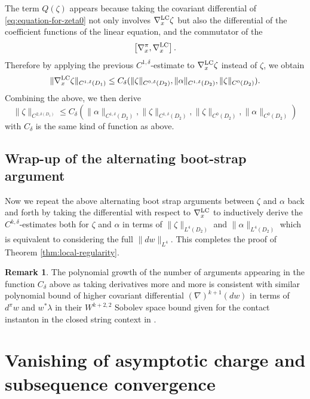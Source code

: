\documentclass[reqno]{amsart}
\theoremstyle{theorem}
\theoremstyle{definition}
\newtheorem{rem}[thm]{Remark}
\numberwithin{equation}{section}
\begin{document}
The term $Q(\zeta)$ appears because taking the covariant
differential of \eqref{eq:equation-for-zeta0} not only involves $\nabla^{\text{\rm LC}}_x \zeta$
but also the differential of the coefficient functions of the linear equation, and
the commutator of the
$$
\left [\nabla^\pi_x,\nabla_x^{\text{\rm LC}} \right].
$$
Therefore by applying the previous $C^{1,\delta}$-estimate to $\nabla_x^{\text{\rm LC}}\zeta$
instead of $\zeta$, we obtain
$$
\|\nabla^{\text{\rm LC}}_x \zeta\|_{C^{1,\delta}(D_1)} \leq
C_\delta(\|\zeta\|_{C^{0,\delta}(D_2)}, \|\alpha \|_{C^{1,\delta}(D_2)},
\|\zeta\|_{C^0(D_2)}).
$$
Combining the above, we  then derive
$$
\|\zeta\|_{C^{2,\delta(D_1)}} \leq C_\delta(\|\alpha\|_{C^{1,\delta}(D_2)},
\|\zeta\|_{C^{1,\delta}(D_2)},
\|\zeta\|_{C^0(D_2)}, \|\alpha\|_{C^0(D_2)})
$$
with $C_\delta$ is the same kind of function as above.

\subsection{Wrap-up of the alternating boot-strap argument}

Now we repeat the above alternating boot strap arguments between $\zeta$ and $\alpha$
back and forth by taking the differential with respect to $\nabla_x^{\text{\rm LC}}$
to inductively derive the $C^{k,\delta}$-estimates both for $\zeta$ and $\alpha$
in terms of $\|\zeta\|_{L^4(D_2)}$ and $\|\alpha\|_{L^4(D_2)}$ which is equivalent to
considering the full $\|dw\|_{L^4}$.
This completes the proof of Theorem \ref{thm:local-regularity}.

\begin{rem} The polynomial growth of the number of arguments appearing in
the function $C_\delta$ above as taking derivatives more and more
 is consistent with similar polynomial  bound of higher covariant differential $(\nabla)^{k+1}(dw)$
 in terms of  $d^\pi w$ and $w^*\lambda$ in their $W^{k+2,2}$ Sobolev space bound
given for the contact instanton in the closed string context
in \cite[Theorem 1.7]{oh-wang:CR-map1}.
\end{rem}


\section{Vanishing of asymptotic charge and subsequence convergence}
\label{sec:subsequence-convergence}
\end{document}
